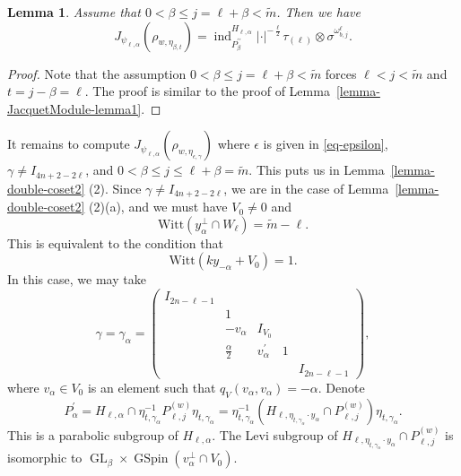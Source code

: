 \documentclass[12pt]{amsart}
\newcommand{\ind}{\operatorname{ind}}
\newcommand{\wt}{\widetilde}
\newtheorem{lemma}[theorem]{Lemma}
\theoremstyle{remark}
\DeclareMathOperator{\GL}{GL}
\DeclareMathOperator{\GSpin}{GSpin}
\begin{document}
\begin{lemma}
\label{lemma-JacquetModule-gamma-lemma2}
Assume that $0< \beta\le j = \ell+\beta< \wt m$. 	Then we have
\begin{equation*}
	J_{\psi_{\ell,\alpha}}(	\rho_{w,\eta_{\beta,t}} ) = \ind_{P_{\beta}^{\prime\prime}}^{H_{\ell,\alpha}} |\cdot|^{-\frac{\ell}{2}} \tau_{(\ell)}\otimes \sigma^{\omega_{b,j}^{\ell}}.
\end{equation*}
\end{lemma}
\begin{proof}
Note that the assumption $0< \beta\le j = \ell+\beta< \wt m$ forces $\ell<j<\wt m$ and $t=j-\beta=\ell$. The proof is similar to the proof of Lemma~\ref{lemma-JacquetModule-lemma1}. 
\end{proof}

It remains to compute $J_{\psi_{\ell,\alpha}}(	\rho_{w,\eta_{\epsilon,\gamma}} )$ where $\epsilon$ is given in \eqref{eq-epsilon}, $\gamma\not=I_{4n+2-2\ell}$, and $0< \beta\le j \le \ell+\beta= \wt m$. This puts us in Lemma~\ref{lemma-double-coset2} (2). Since $\gamma\not=I_{4n+2-2\ell}$, we are in the case of Lemma~\ref{lemma-double-coset2} (2)(a), and we must have $V_0\not=0$ and
\begin{equation*}
\mathrm{Witt}( y_{\alpha}^\perp \cap W_{\ell} )=\wt m-\ell.
\end{equation*}
This is equivalent to the condition that
\begin{equation*}
\mathrm{Witt}(k y_{-\alpha}+V_0)=1.	
\end{equation*}
In this case, we may take
\begin{equation}
\label{eq-gamma-alpha}
\gamma=
\gamma_\alpha=
\begin{pmatrix}
I_{2n-\ell-1} &&&&\\
&1&&&\\
&-v_{\alpha} &I_{V_0} &&\\
&\frac{\alpha}{2} &v_{\alpha}^\prime &1&\\
&&&&I_{2n-\ell-1}
\end{pmatrix},
\end{equation}
where $v_\alpha\in V_0$ is an element such that $q_V(v_\alpha, v_\alpha)=-\alpha$. Denote 
\begin{equation}
\label{eq-P_alpha^prime}
P_{\alpha}^\prime=H_{\ell,\alpha}\cap \eta_{t,\gamma_\alpha}^{-1} P_{\ell,j}^{(w)} \eta_{t,\gamma_\alpha}= \eta_{t,\gamma_\alpha}^{-1} (H_{\ell, \eta_{t,\gamma_\alpha} \cdot y_\alpha }\cap P_{\ell,j}^{(w)}) \eta_{t,\gamma_\alpha}.
\end{equation}
This is a parabolic subgroup of $H_{\ell,\alpha}$. The Levi subgroup of $H_{\ell, \eta_{t,\gamma_\alpha} \cdot y_\alpha }\cap P_{\ell,j}^{(w)}$ is isomorphic to $\GL_\beta\times \GSpin(v_\alpha^\perp\cap V_0)$.
 
\end{document}
